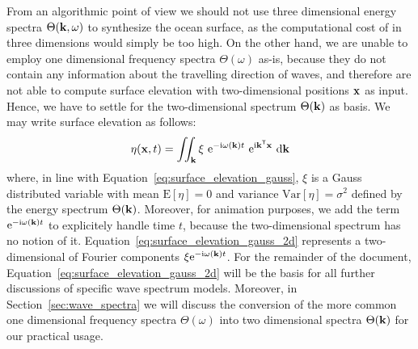 From an algorithmic point of view we should not use three dimensional
energy spectra $\Theta(\mathbf{k},\omega)$ to synthesize the ocean surface, as
the computational cost of \FourierTransforms in three dimensions would simply
be too high.
On the other hand, we are unable to employ one dimensional frequency spectra
$\Theta(\omega)$ as-is, because they do not contain any information about
the  travelling direction of waves, and therefore are not able to compute 
surface elevation with two-dimensional positions $\mathbf{x}$ as input.
Hence, we have to settle for the two-dimensional \wavenumber spectrum
$\Theta(\mathbf{k})$ as basis. We may write surface elevation as follows:
\begin{equation}
\label{eq:surface_elevation_gauss_2d}
 \eta(\mathbf{x}, t) = \iint_{\mathbf{k}} 
\xi~\mathrm{e}^{-\mathrm{i}\omega(\mathbf{k}) t}
~\mathrm{e}^{\mathrm{i}\mathbf{k}^{\mathsf{T}}\mathbf{x}}~\mathrm{d}\mathbf{k}
\end{equation}
where, in line with Equation~\ref{eq:surface_elevation_gauss}, $\xi$ is 
a Gauss distributed variable with mean $\mathrm{E}[\eta] = 0$ and
variance $\mathrm{Var}[\eta] = \sigma^2$ defined by the energy spectrum
$\Theta(\mathbf{k})$. Moreover, for animation purposes, we add the term 
$\mathrm{e}^{-\mathrm{i}\omega(\mathbf{k}) t}$ to explicitely handle 
time $t$, because the two-dimensional \wavenumber spectrum has no notion of 
it. Equation~\ref{eq:surface_elevation_gauss_2d} represents a two-dimensional 
\InvFourierTransform of Fourier components 
$\xi\mathrm{e}^{-\mathrm{i}\omega(\mathbf{k}) t}$. For the remainder of the 
document, Equation~\ref{eq:surface_elevation_gauss_2d} will be the basis for all 
further discussions of specific wave spectrum models. Moreover, in 
Section~\ref{sec:wave_spectra} we will discuss the conversion of the 
more common one dimensional frequency spectra $\Theta(\omega)$ into two 
dimensional \wavenumber spectra $\Theta(\mathbf{k})$ for our practical usage.
%
